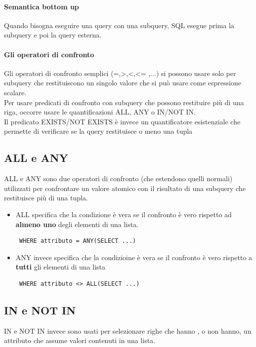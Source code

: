 \documentclass[12pt, a4paper, openany]{book}
\begin{document}
\paragraph{Semantica bottom up}
Quando bisogna eseguire una query con una subquery, SQL esegue prima la subquery e poi la query esterna.

\paragraph{Gli operatori di confronto}
Gli operatori di confronto semplici (=,>,<,<= ,...) si possono usare solo per subquery che restituiscono un singolo valore che si può usare come espressione scalare.
\\Per usare predicati di confronto con subquery che possono restituire più di una riga, occorre usare le quantificazioni ALL, ANY o IN/NOT IN.
\\Il predicato EXISTS/NOT EXISTS è invece un quantificatore esistenziale che permette di verificare se la query restituisce o meno una tupla

\subsection*{ALL e ANY}
ALL e ANY sono due operatori di confronto (che estendono quelli normali) utilizzati per confrontare un valore atomico con il risultato di una subquery che restituisce più di una tupla.
\begin{itemize}
    \item ALL specifica che la condizione è vera se il confronto è vero rispetto ad \textbf{almeno uno} degli elementi di una lista.
    \begin{verbatim} WHERE attributo = ANY(SELECT ...) \end{verbatim}
    \item ANY invece specifica che la condizioine è vera se il confronto è vero rispetto a \textbf{tutti} gli elementi di una lista
    \begin{verbatim} WHERE attributo <> ALL(SELECT ...) \end{verbatim}
\end{itemize}

\subsection*{IN e NOT IN}
IN e NOT IN invece sono usati per selezionare righe che hanno , o non hanno, un attributo che assume valori contenuti in una lista.
\end{document}
